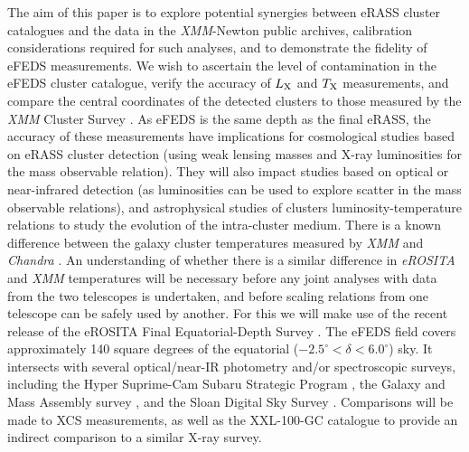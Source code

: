 \documentclass[fleqn,usenatbib]{mnras}
\begin{document}
The aim of this paper is to explore potential synergies between eRASS cluster catalogues and the data in the {\em XMM}-Newton public archives, calibration considerations required for such analyses, and to demonstrate the fidelity of eFEDS measurements. We wish to ascertain the level of contamination in the eFEDS cluster catalogue, verify the accuracy of $L_{\rm{X}}$ and $T_{\rm{X}}$ measurements, and compare the central coordinates of the detected clusters to those measured by the {\em XMM} Cluster Survey \citep[XCS, ][]{xcsfoundation}. As eFEDS is the same depth as the final eRASS, the accuracy of these measurements have implications for cosmological studies based on eRASS cluster detection (using weak lensing masses and X-ray luminosities for the mass observable relation). They will also impact studies based on optical or near-infrared detection (as luminosities can be used to explore scatter in the mass observable relations), and astrophysical studies of clusters luminosity-temperature relations to study the evolution of the intra-cluster medium. There is a known difference between the galaxy cluster temperatures measured by {\em XMM} and {\em Chandra} \citep[][]{xmmchandracal}. An understanding of whether there is a similar difference in {\em eROSITA} and {\em XMM} temperatures will be necessary before any joint analyses with data from the two telescopes is undertaken, and before scaling relations from one telescope can be safely used by another. For this we will make use of the recent release of the eROSITA Final Equatorial-Depth Survey \citep[eFEDS,][]{efedscat}. The eFEDS field covers approximately 140 square degrees of the equatorial ($-2.5^{\circ}<\delta<6.0^{\circ}$) sky. It intersects with several optical/near-IR photometry and/or spectroscopic surveys, including the Hyper Suprime-Cam Subaru Strategic Program \citep[HSC SSP, ][]{hscsurvey}, the Galaxy and Mass Assembly survey \citep[GAMA, ][]{gamasurvey}, and the Sloan Digital Sky Survey \citep[SDSS, ][]{sdss}.  Comparisons will be made to XCS measurements, as well as the XXL-100-GC catalogue \citep[][]{xxlgc100} to provide an indirect comparison to a similar X-ray survey.

\end{document}

